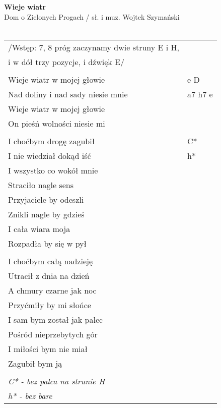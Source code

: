 \documentclass[a5paper]{article}
\begin{document}


\noindent
\fontsize{12pt}{15pt}\selectfont
\textbf{Wieje wiatr} \\
\fontsize{8pt}{10pt}\selectfont
Dom o Zielonych Progach / sł. i muz. Wojtek Szymański \\ \\
\fontsize{10pt}{12pt}\selectfont
{}
\begin{tabular}{@{}p{7.50cm}p{3cm}@{}}
\noindent
/Wstęp: 7, 8 próg zaczynamy dwie struny E i H, \\
i w dół trzy pozycje, i dźwięk E/ \\ \\

Wieje wiatr w mojej głowie & e D \\
Nad doliny i nad sady niesie mnie & a7 h7 e \\
Wieje wiatr w mojej głowie \\
On pieśń wolności niesie mi \\ \\

I choćbym drogę zagubił	& C* \\
I nie wiedział dokąd iść & h* \\
I wszystko co wokół mnie \\
Straciło nagle sens \\
Przyjaciele by odeszli \\
Znikli nagle by gdzieś \\
I cała wiara moja \\
Rozpadła by się w pył \\ \\

I choćbym całą nadzieję \\ 
Utracił z dnia na dzień \\
A chmury czarne jak noc \\
Przyćmiły by mi słońce \\
I sam bym został jak palec \\
Pośród nieprzebytych gór \\
I miłości bym nie miał \\
Zagubił bym ją \\ \\
\emph{C* - bez palca na strunie H} \\
\emph{h* - bez bare}
\end{tabular}
\end{document}
